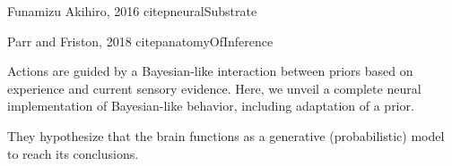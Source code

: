 Funamizu Akihiro, 2016 citep{neuralSubstrate}


Parr and Friston, 2018 citep{anatomyOfInference} 

\citep{neuralImplementationOfBayesionInferenceSensoryMotor}
Actions are guided by a Bayesian-like interaction between priors based on experience and current sensory evidence. Here, we unveil a complete neural implementation of Bayesian-like behavior, including adaptation of a prior. 


They hypothesize that the brain functions as a generative (probabilistic) model to reach its conclusions. 